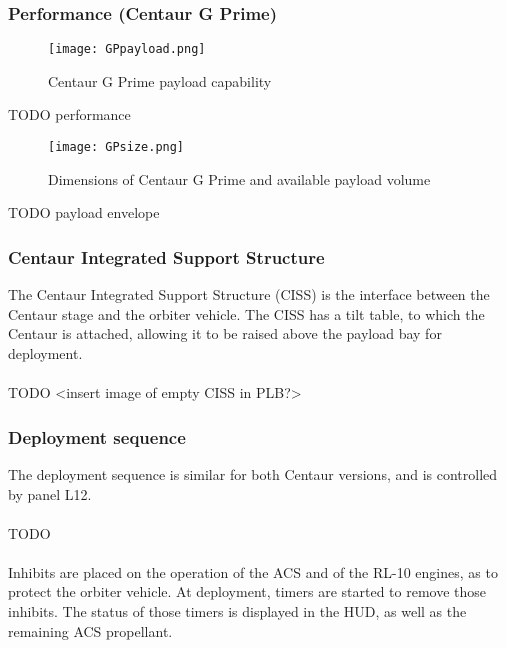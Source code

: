 \documentclass[Space_Shuttle_Ultra_Manual.tex]{subfiles}
\begin{document}
\begin{multicols*}{2}
\subsubsection{Performance (Centaur G Prime)}
\begin{figure}[H]
	\centering
	\captionsetup{justification=centering}
  \texttt{[image: GPpayload.png]}
  \caption{Centaur G Prime payload capability}
  \label{fig:GPpayload}
\end{figure}
TODO performance

\begin{figure}[H]
	\centering
	\captionsetup{justification=centering}
  \texttt{[image: GPsize.png]}
  \caption{Dimensions of Centaur G Prime and available payload volume}
  \label{fig:Gpsize}
\end{figure}
TODO payload envelope

\subsubsection{Centaur Integrated Support Structure}
The Centaur Integrated Support Structure (CISS) is the interface between the Centaur stage and the orbiter vehicle. The CISS has a tilt table, to which the Centaur is attached, allowing it to be raised above the payload bay for deployment.
\\
\\
TODO <insert image of empty CISS in PLB?>

\subsubsection{Deployment sequence}
The deployment sequence is similar for both Centaur versions, and is controlled by panel L12.
\\
\\
TODO
\\
\\
Inhibits are placed on the operation of the ACS and of the RL-10 engines, as to protect the orbiter vehicle. At deployment, timers are started to remove those inhibits. The status of those timers is displayed in the HUD, as well as the remaining ACS propellant.


\end{multicols*}
\end{document}
